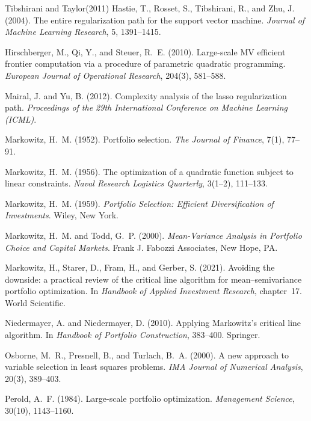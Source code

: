 \documentclass[sts]{imsart}
\theoremstyle{plain}
\theoremstyle{definition}
\begin{document}
\begin{thebibliography}{Tibshirani and Taylor(2011)}
 Hastie, T., Rosset, S., Tibshirani, R.,
and Zhu, J. (2004). The entire regularization path for the support vector machine.
\emph{Journal of Machine Learning Research}, 5, 1391--1415.

 Hirschberger, M., Qi, Y., and
Steuer, R.~E. (2010). Large-scale MV efficient frontier computation via a procedure of
parametric quadratic programming. \emph{European Journal of Operational Research},
204(3), 581--588.

 Mairal, J. and Yu, B. (2012). Complexity
analysis of the lasso regularization path. \emph{Proceedings of the 29th
International Conference on Machine Learning (ICML)}.

 Markowitz, H.~M. (1952). Portfolio selection.
\emph{The Journal of Finance}, 7(1), 77--91.

 Markowitz, H.~M. (1956). The optimization of
a quadratic function subject to linear constraints. \emph{Naval Research Logistics
Quarterly}, 3(1--2), 111--133.

 Markowitz, H.~M. (1959). \emph{Portfolio
Selection: Efficient Diversification of Investments}. Wiley, New York.

 Markowitz, H.~M. and Todd, G.~P.
(2000). \emph{Mean-Variance Analysis in Portfolio Choice and Capital Markets}. Frank
J. Fabozzi Associates, New Hope, PA.

 Markowitz, H., Starer, D., Fram, H.,
and Gerber, S. (2021). Avoiding the downside: a practical review of the critical line
algorithm for mean--semivariance portfolio optimization. In \emph{Handbook of Applied
Investment Research}, chapter~17. World Scientific.

 Niedermayer, A. and
Niedermayer, D. (2010). Applying Markowitz's critical line algorithm. In \emph{Handbook
of Portfolio Construction}, 383--400. Springer.

 Osborne, M.~R., Presnell, B., and
Turlach, B.~A. (2000). A new approach to variable selection in least squares
problems. \emph{IMA Journal of Numerical Analysis}, 20(3), 389--403.

 Perold, A.~F. (1984). Large-scale portfolio
optimization. \emph{Management Science}, 30(10), 1143--1160.


\end{thebibliography}
\end{document}
